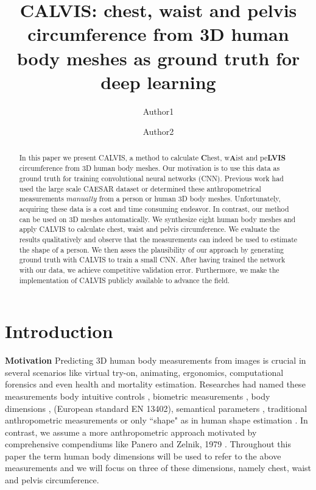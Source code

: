 \documentclass[runningheads, orivec]{llncs}
\begin{document}
%
\title{CALVIS: chest, waist and pelvis circumference from 3D human body meshes	
as ground truth for deep learning}
%
%
\author{Author1 \and
Author2}
%
%
%
\maketitle              %
%
\begin{abstract}
In this paper we present CALVIS, a method to calculate \textbf{C}hest, 
w\textbf{A}ist and pe\textbf{LVIS} circumference from 3D human body meshes. Our 
motivation is to use 
this data as ground truth for training convolutional neural networks 
(CNN). Previous work had used the large scale CAESAR dataset or determined 
these anthropometrical measurements $\textit{manually}$ from a person 
or human 3D body meshes. 
Unfortunately, acquiring these data is a cost and 
time consuming endeavor. In contrast, our method can be used on 
3D meshes automatically. We synthesize eight human body meshes and 
apply 
CALVIS to calculate chest, waist and pelvis circumference. We evaluate the 
results qualitatively and observe that the measurements can indeed be used 
to estimate the shape of a person. We then asses the 
plausibility of our approach by generating
ground truth with CALVIS to train a small CNN. After
having trained the network with 
our data, we achieve competitive validation error.
Furthermore, we make the implementation of CALVIS publicly available to 
advance the field.

\end{abstract}
%
%
%
\section{Introduction}\label{sec:intro}
\textbf{Motivation} 
Predicting 3D human body measurements from images is crucial in several 
scenarios 
like virtual try-on, animating, ergonomics, computational forensics and 
even health and mortality estimation. Researches had 
named these
measurements body intuitive controls \cite{Allen.2003}, biometric 
measurements \cite{Sigal.2008}, body dimensions 
\cite{DBLP:conf/bmvc/ChenRC11}, (European standard EN 13402), semantical 
parameters \cite{Yang.2014}, 
traditional anthropometric 
measurements 
\cite{Wuhrer2011} or only ``shape" as in human shape estimation 
\cite{Guan.2013,Bogo:ECCV:2016,Loper.2015,Dibra.2016a,Pishchulin.2017}. In 
contrast, we assume a more 
anthropometric approach 
motivated by comprehensive compendiums like Panero and Zelnik, 1979 
\cite{panero1979human}.
Throughout this paper the term human body 
dimensions 
will be used to refer to the above measurements and we will focus on three of 
these dimensions, namely chest, waist and 
pelvis circumference.
\end{document}
